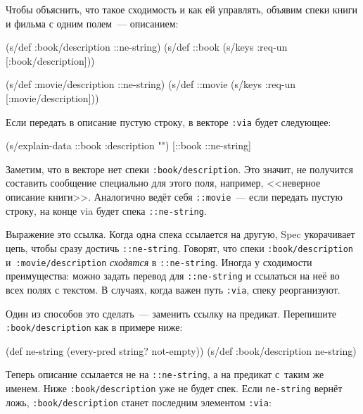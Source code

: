 Чтобы объяснить, что такое сходимость и как ей управлять, объявим спеки книги и
фильма с одним полем~--- описанием:

\begin{english}
  \begin{clojure}
(s/def :book/description ::ne-string)
(s/def ::book (s/keys :req-un [:book/description]))

(s/def :movie/description ::ne-string)
(s/def ::movie (s/keys :req-un [:movie/description]))
  \end{clojure}
\end{english}

Если передать в описание пустую строку, в векторе \verb|:via| будет следующее:

\begin{english}
  \begin{clojure}
(s/explain-data ::book {:description ""})
[::book ::ne-string]
  \end{clojure}
\end{english}

Заметим, что в векторе нет спеки \verb|:book/description|. Это значит, не
получится составить сообщение специально для этого поля, например, <<неверное
описание книги>>. Аналогично ведёт себя \verb|::movie|~--- если передать
пустую строку, на конце via будет спека \verb|::ne-string|.

Выражение  это
ссылка. Когда одна спека ссылается на другую, Spec укорачивает цепь, чтобы сразу
достичь \verb|::ne-string|. Говорят, что спеки \verb|:book/description|
и~\verb|:movie/description| \emph{сходятся} в \verb|::ne-string|. Иногда у
сходимости преимущества: можно задать перевод для \verb|::ne-string| и ссылаться
на неё во всех полях с текстом. В случаях, когда важен путь \verb|:via|, спеку
реорганизуют.

Один из способов это сделать~--- заменить ссылку на предикат. Перепишите
\verb|:book/description| как в примере ниже:

\begin{english}
  \begin{clojure}
(def ne-string (every-pred string? not-empty))
(s/def :book/description ne-string)
  \end{clojure}
\end{english}

Теперь описание ссылается не на \verb|::ne-string|, а на предикат с~таким же
именем. Ниже \verb|:book/description| уже не будет спек. Если
\verb|ne-string| вернёт ложь, \verb|:book/description| станет последним
элементом \verb|:via|:

